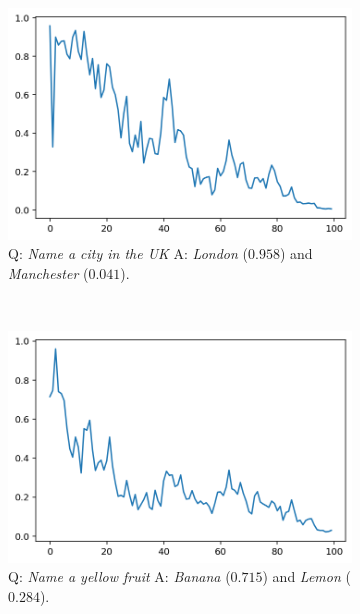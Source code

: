 \documentclass[a4paper]{article}
\theoremstyle{plain}
\theoremstyle{definition}
\theoremstyle{plain}
\begin{document}
\begin{figure}[t]
\begin{center}
    \begin{subfigure}[t]{0.23\linewidth}
      \includegraphics[width=\textwidth]{prob_name_city.png}
    \caption*{\tiny Q: \emph{Name a city in the UK} A: \emph{London} ($0.958$) and \emph{Manchester} ($0.041$).}
  \end{subfigure}
  ~~
  \begin{subfigure}[t]{0.23\linewidth}
    \includegraphics[width=\textwidth]{prob_name_fruit.png}
    \caption*{\tiny Q: \emph{Name a yellow fruit} A: \emph{Banana} ($0.715$) and \emph{Lemon} ($0.284$).}
  \end{subfigure}
  ~~
  \begin{subfigure}[t]{0.23\linewidth}

\end{subfigure}
\end{center}
\end{figure}
\end{document}
